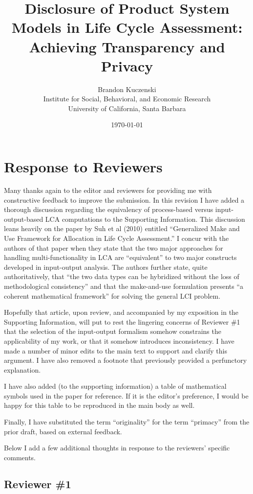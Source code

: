 \documentclass[11pt,letterpaper]{article}
\title{Disclosure of Product System Models in Life Cycle Assessment: Achieving Transparency and Privacy}
\author{Brandon Kuczenski\\
Institute for Social, Behavioral, and Economic Research\\
University of California, Santa Barbara}
\date{\mydate\today}
\begin{document}
\maketitle

\def\rquote#1{\quote{\textit{#1}}}

\section*{Response to Reviewers}

Many thanks again to the editor and reviewers for providing me with constructive feedback to improve the submission.  In this revision I have added a thorough discussion regarding the equivalency of process-based versus input-output-based LCA computations to the Supporting Information.  This discussion leans heavily on the paper by Suh et al (2010) entitled ``Generalized Make and Use Framework for Allocation in Life Cycle Assessment.''  I concur with the authors of that paper when they state that the two major approaches for handling multi-functionality in LCA are ``equivalent'' to two major constructs developed in input-output analysis.  The authors further state, quite authoritatively, that ``the two data types can be hybridized without the loss of methodological consistency'' and that the make-and-use formulation presents ``a coherent mathematical framework'' for solving the general LCI problem.

Hopefully that article, upon review, and accompanied by my exposition in the Supporting Information, will put to rest the lingering concerns of Reviewer \#1 that the selection of the input-output formalism somehow constrains the applicability of my work, or that it somehow introduces inconsistency.  I have made a number of minor edits to the main text to support and clarify this argument.  I have also removed a footnote that previously provided a perfunctory explanation.

I have also added (to the supporting information) a table of mathematical symbols used in the paper for reference.  If it is the editor's preference, I would be happy for this table to be reproduced in the main body as well.

Finally, I have substituted the term ``originality'' for the term ``primacy'' from the prior draft, based on external feedback.

Below I add a few additional thoughts in response to the reviewers' specific comments.

\subsection*{Reviewer \#1}
\end{document}
